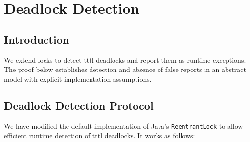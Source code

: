 \chapter{Deadlock Detection}
\label{protocol}

\section{Introduction}

We extend locks to detect \ac{tttl} deadlocks and report them as runtime exceptions.
The proof below establishes detection and absence of false reports in an abstract model with explicit implementation assumptions.

\section{Deadlock Detection Protocol}

We have modified the default implementation of Java's {\tt ReentrantLock} to allow efficient runtime detection of \ac{tttl} deadlocks. It works as follows:

